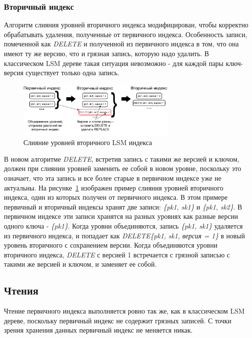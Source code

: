 \documentclass[a4paper,hidelinks,12pt]{article}
\begin{document}
\subsubsection{Вторичный индекс}
Алгоритм слияния уровней вторичного индекса модифицирован, чтобы корректно
обрабатывать удаления, полученные от первичного индекса. Особенность записи,
помеченной как \textit{DELETE} и полученной из первичного индекса в том, что она
имеют ту же версию, что и грязная запись, которую надо удалить. В классическом
LSM дереве такая ситуация невозможно - для каждой пары ключ-версия существует
только одна запись.

\begin{figure}[h]
\centering
\includegraphics[width=0.7\textwidth]{secondary_compaction_example}
\caption{Слияние уровней вторичного LSM индекса}
\label{fig:secondary_compaction_example}
\end{figure}

В новом алгоритме \textit{DELETE}, встретив запись с такими же версией и ключом,
должен при слиянии уровней заменить ее собой в новом уровне, поскольку это
означает, что эта запись и все более старые в первичном индексе уже не
актуальны. На рисунке~\ref{fig:secondary_compaction_example} изображен пример
слияния уровней вторичного индекса, один из которых получен от первичного
индекса. В этом примере первичный и вторичный индексы хранят две записи:
\textit{\{pk1, sk1\}} и \textit{\{pk1, sk2\}}. В первичном индексе эти записи
хранятся на разных уровнях как разные версии одного ключа - \textit{\{pk1\}}.
Когда уровни объединяются, запись \textit{\{pk1, sk1\}} удаляется из первичного
индекса, и попадает как \textit {DELETE\{pk1, sk1, версия = 1\}} в новый уровень
вторичного с сохранением версии. Когда объединяются уровни вторичного индекса,
\textit{DELETE} с версией 1 встречается с грязной записью с такими же версией и
ключом, и заменяет ее собой.

\subsection{Чтения}
Чтение первичного индекса выполняется ровно так же, как в классическом LSM
дереве, поскольку первичный индекс не содержит грязных записей. С точки зрения
хранения данных первичный индекс не меняется никак.
\end{document}
